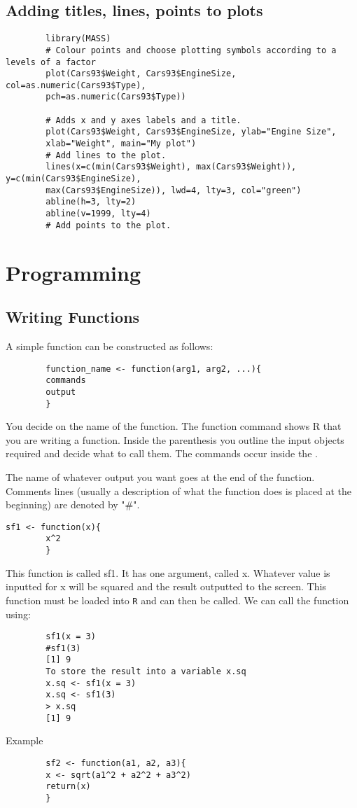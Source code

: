 \documentclass[a4paper,12pt]{article}
\begin{document}
\begin{itemize}
		
		\section{Adding titles, lines, points to plots}
		
		
		\large \begin{verbatim}
		library(MASS)
		# Colour points and choose plotting symbols according to a levels of a factor
		plot(Cars93$Weight, Cars93$EngineSize, col=as.numeric(Cars93$Type),
		pch=as.numeric(Cars93$Type))
		
		# Adds x and y axes labels and a title.
		plot(Cars93$Weight, Cars93$EngineSize, ylab="Engine Size",
		xlab="Weight", main="My plot")
		# Add lines to the plot.
		lines(x=c(min(Cars93$Weight), max(Cars93$Weight)), y=c(min(Cars93$EngineSize),
		max(Cars93$EngineSize)), lwd=4, lty=3, col="green")
		abline(h=3, lty=2)
		abline(v=1999, lty=4)
		# Add points to the plot.
		\end{verbatim}\large
		
		\newpage
		\chapter{Programming}
		
		\section{Writing Functions}
		
		A simple function can be constructed as follows:
		
		\begin{verbatim}
		function_name <- function(arg1, arg2, ...){
		commands
		output
		}
		\end{verbatim}
		
		You decide on the name of the function. The function command shows R that you are writing a function. Inside the parenthesis you outline the input objects required and decide what to call them. The commands occur inside the { }.
		
		The name of whatever output you want goes at the end of the function. Comments lines (usually a description of what the function does is placed at the beginning) are denoted by "\#".
		
		\begin{verbatim}sf1 <- function(x){
		x^2
		}
		\end{verbatim}
		
		This function is called sf1. It has one argument, called x.
		Whatever value is inputted for x will be squared and the result outputted to the screen. This function must be loaded into \texttt{R} and can then be called. We can call the function using:
		\begin{verbatim}
		sf1(x = 3)
		#sf1(3)
		[1] 9
		To store the result into a variable x.sq
		x.sq <- sf1(x = 3)
		x.sq <- sf1(3)
		> x.sq
		[1] 9
		\end{verbatim}
		Example
		\begin{verbatim}
		sf2 <- function(a1, a2, a3){
		x <- sqrt(a1^2 + a2^2 + a3^2)
		return(x)
		}
		\end{verbatim}
		

\end{itemize}
\end{document}
